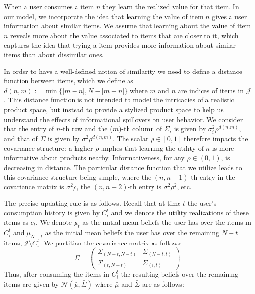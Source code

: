 \documentclass[format=acmsmall, review=false]{acmart}
\newcommand{\xhdr}[1]{\vspace{1mm} \noindent{\bf #1}}
\begin{document}
\xhdr{User Learning}
When a user consumes a item $n$ they learn the realized value for that item. In our model, we incorporate the idea that learning the value of item $n$ gives a user information about similar items. 
We assume that learning about the value of item $n$ reveals more about the value associated to items that are closer to it, which captures the idea that trying a item provides more information about similar items than about dissimilar ones.
\par
In order to have a well-defined notion of similarity we need to define a distance function between items, which we define as $d(n,m):=\min\{ \lvert m - n \rvert ,N - \lvert m - n \rvert \}$ where $m$ and $n$ are indices of items in $\mathcal{J}$. This distance function is not intended to model the intricacies of a realistic product space, but instead to provide a stylized product space to help us understand the effects of informational spillovers on user behavior. We consider that the entry of $n$-th row and the ($m$)-th column of $\Sigma_i$ is given by $\sigma_i^2 \rho^{d(n,m)}$, and that of $\Sigma$ is given by $\sigma^2 \rho^{d(n,m)}$. The scalar $\rho \in [0,1]$ therefore impacts the covariance structure: a higher $\rho$ implies that learning the utility of $n$ is more informative about products nearby. Informativeness, for any $\rho \in (0,1)$, is decreasing in distance. The particular distance function that we utilize leads to this covariance structure being simple, where the $(n,n+1)$-th entry in the covariance matrix is $\sigma^{2} \rho$, the $(n,n+2)$-th entry is $\sigma^{2} \rho^2$, etc.
\par
The precise updating rule is as follows. Recall that at time $t$ the user's consumption history is given by $C_{i}^{t}$ and we denote the utility realizations of these items as $c_t$. We denote $\mu_t$ as the initial mean beliefs the user has over the items in $C_{i}^{t}$ and $\mu_{N-t}$ as the initial mean beliefs the user has over the remaining $N-t$ items, $\mathcal{J} \setminus C_{i}^{t}$. We partition the covariance matrix as follows:
\[ \Sigma =  \left( \begin{array}{cc}
\Sigma_{(N-t, N-t)} & \Sigma_{(N-t,t)} \\
\Sigma_{(t,N-t)} & \Sigma_{(t,t)}
\end{array} \right)
\]
Thus, after consuming the items in $C_{i}^{t}$ the resulting beliefs over the remaining items are given by $\mathcal{N}(\bar{\mu}, \bar{\Sigma})$ where $\bar{\mu}$ and $\bar{\Sigma}$ are as follows:
\end{document}
